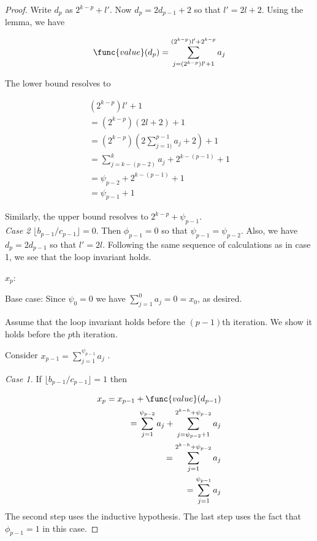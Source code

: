 \documentclass[11pt, answers]{exam}
\theoremstyle{plain}
\theoremstyle{definition}
\begin{document}
\begin{questions}
\begin{parts}
\begin{solution}
\begin{proof}
Write $d_p$ as $2^{k-p} + \mathit{l}'$. Now $d_p = 2d_{p-1} + 2$ so that $\mathit{l'} = 2\mathit{l} + 2$. Using the lemma, we have

\begin{align*}
\func{value}(d_p) = \sum_{j = (2^{k-p})\mathit{l'} + 1}^{(2^{k-p})\mathit{l'} + 2^{k-p}}a_j \\
\end{align*}

The lower bound resolves to 

\begin{align*}
(2^{k-p})\mathit{l'} + 1 \\
= (2^{k-p})(2\mathit{l} + 2) + 1 \\
= (2^{k-p})(2 \sum_{j=1)}^{p-1}a_j + 2) + 1 \\
= \sum_{j=k-(p-2)}^{k}a_j + 2^{k-(p-1)} + 1 \\
= \psi_{p-2} + 2^{k-(p-1)} + 1 \\
= \psi_{p-1} + 1
\end{align*}

Similarly, the upper bound resolves to $2^{k-p} + \psi_{p-1}$.\\

\textit{Case 2} $\lfloor b_{p-1}/c_{p-1} \rfloor = 0$. Then $\phi_{p-1} = 0$ so that $\psi_{p-1} = \psi_{p-2}.$ Also, we have $d_p = 2d_{p-1}$ so that $\mathit{l'} = 2\mathit{l}$. Following the same sequence of calculations as in case 1, we see that the loop invariant holds.

$x_p$:

Base case: Since $\psi_0 = 0$ we have $\sum_{j=1}^{0}a_j = 0 = x_0$, as desired.

Assume that the loop invariant holds before the $(p-1)$th iteration. We show it holds before the $p$th iteration.

Consider $x_{p-1} = \sum_{j=1}^{\psi_{p-1}}a_j$ .

\textit{Case 1.} If $\lfloor b_{p-1} / c_{p-1} \rfloor = 1$ then 

\begin{align*}
x_p = x_{p-1} + \func{value}(d_{p-1}) \\
= \sum_{j=1}^{\psi_{p-2}}a_j 
+ \sum_{j=\psi_{p-2} + 1}^{2^{k-h} + \psi_{p-2}}a_j \\
= \sum_{j=1}^{2^{k-h} + \psi_{p-2}}a_j \\
= \sum_{j=1}^{\psi_{p-1}}a_j \\
\end{align*}
The second step uses the inductive hypothesis. The last step uses the fact that $\phi_{p-1} = 1$ in this case.


\end{proof}
\end{solution}
\end{parts}
\end{questions}
\end{document}
